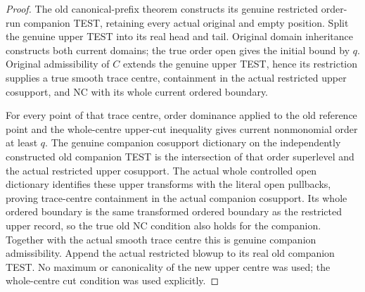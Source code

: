 \begin{proof}
The old canonical-prefix theorem constructs its genuine restricted order-run
companion TEST, retaining every actual original and empty position. Split
the genuine upper TEST into its real head and tail. Original domain
inheritance constructs both current domains; the true order open gives the
initial bound by $q$. Original admissibility of $C$ extends the genuine upper
TEST, hence its restriction supplies a true smooth trace centre, containment
in the actual restricted upper cosupport, and NC with its whole current
ordered boundary.

For every point of that trace centre, order dominance applied to the old
reference point and the whole-centre upper-cut inequality gives current
nonmonomial order at least $q$. The genuine companion cosupport dictionary
on the independently constructed old companion TEST is the intersection of
that order superlevel and the actual restricted upper cosupport. The actual
whole controlled open dictionary identifies these upper transforms with the
literal open pullbacks, proving trace-centre containment in the actual
companion cosupport. Its whole ordered boundary is the same transformed
ordered boundary as the restricted upper record, so the true old NC condition
also holds for the companion. Together with the actual smooth trace centre
this is genuine companion admissibility. Append the actual restricted
blowup to its real old companion TEST. No maximum or canonicality of the new
upper centre was used; the whole-centre cut condition was used explicitly.
\end{proof}

